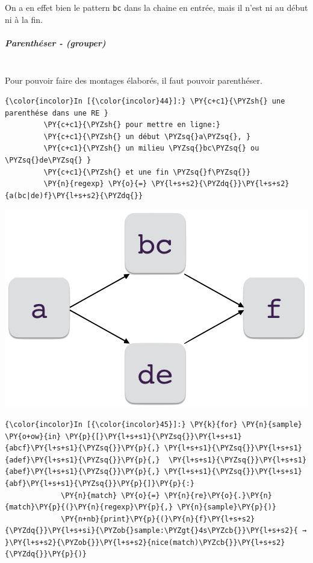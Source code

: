     On a en effet bien le pattern \texttt{bc} dans la chaine en entrée, mais
il n'est ni au début ni à la fin.

    \hypertarget{parenthuxe9ser---grouper}{%
\subparagraph{Parenthéser - (grouper)\\\\}\label{parenthuxe9ser---grouper}}

    Pour pouvoir faire des montages élaborés, il faut pouvoir parenthéser.

    \begin{Verbatim}[commandchars=\\\{\}]
{\color{incolor}In [{\color{incolor}44}]:} \PY{c+c1}{\PYZsh{} une parenthése dans une RE }
         \PY{c+c1}{\PYZsh{} pour mettre en ligne:}
         \PY{c+c1}{\PYZsh{} un début \PYZsq{}a\PYZsq{}, }
         \PY{c+c1}{\PYZsh{} un milieu \PYZsq{}bc\PYZsq{} ou \PYZsq{}de\PYZsq{} }
         \PY{c+c1}{\PYZsh{} et une fin \PYZsq{}f\PYZsq{}}
         \PY{n}{regexp} \PY{o}{=} \PY{l+s+s2}{\PYZdq{}}\PY{l+s+s2}{a(bc|de)f}\PY{l+s+s2}{\PYZdq{}}
\end{Verbatim}

\includegraphics{medias/re-serie-parallele.png}\\
    

    \begin{Verbatim}[commandchars=\\\{\}]
{\color{incolor}In [{\color{incolor}45}]:} \PY{k}{for} \PY{n}{sample} \PY{o+ow}{in} \PY{p}{[}\PY{l+s+s1}{\PYZsq{}}\PY{l+s+s1}{abcf}\PY{l+s+s1}{\PYZsq{}}\PY{p}{,} \PY{l+s+s1}{\PYZsq{}}\PY{l+s+s1}{adef}\PY{l+s+s1}{\PYZsq{}}\PY{p}{,}  \PY{l+s+s1}{\PYZsq{}}\PY{l+s+s1}{abef}\PY{l+s+s1}{\PYZsq{}}\PY{p}{,} \PY{l+s+s1}{\PYZsq{}}\PY{l+s+s1}{abf}\PY{l+s+s1}{\PYZsq{}}\PY{p}{]}\PY{p}{:}
             \PY{n}{match} \PY{o}{=} \PY{n}{re}\PY{o}{.}\PY{n}{match}\PY{p}{(}\PY{n}{regexp}\PY{p}{,} \PY{n}{sample}\PY{p}{)}
             \PY{n+nb}{print}\PY{p}{(}\PY{n}{f}\PY{l+s+s2}{\PYZdq{}}\PY{l+s+si}{\PYZob{}sample:\PYZgt{}4s\PYZcb{}}\PY{l+s+s2}{ → }\PY{l+s+s2}{\PYZob{}}\PY{l+s+s2}{nice(match)\PYZcb{}}\PY{l+s+s2}{\PYZdq{}}\PY{p}{)}
\end{Verbatim}


